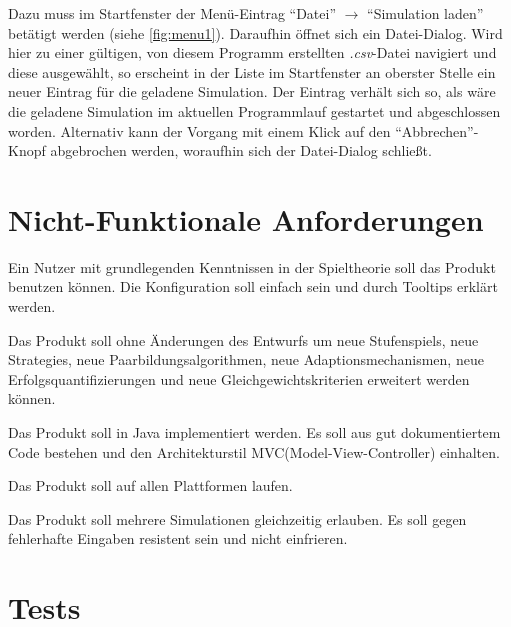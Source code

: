 \documentclass[parskip=full,11pt]{scrartcl}
\begin{document}
Dazu muss im Startfenster der Menü-Eintrag \enquote{Datei} \(\rightarrow\) \enquote{Simulation laden} betätigt werden (siehe \cref{fig:menu1}). Daraufhin öffnet sich ein Datei-Dialog. Wird hier zu einer gültigen, von diesem Programm erstellten \textit{.csv}-Datei navigiert und diese ausgewählt, so erscheint in der Liste im Startfenster an oberster Stelle ein neuer Eintrag für die geladene Simulation. Der Eintrag verhält sich so, als wäre die geladene Simulation im aktuellen Programmlauf gestartet und abgeschlossen worden. Alternativ kann der Vorgang mit einem Klick auf den \enquote{Abbrechen}-Knopf abgebrochen werden, woraufhin sich der Datei-Dialog schließt.

\section{Nicht-Funktionale Anforderungen}


Ein \Gls{Nutzer} mit grundlegenden Kenntnissen in der Spieltheorie soll das Produkt benutzen können. Die \Gls{Konfiguration} soll einfach sein und durch Tooltips erklärt werden.


Das Produkt soll ohne Änderungen des Entwurfs um neue \Glspl{Stufenspiel}, neue \Glspl{Strategie}, neue Paarbildungsalgorithmen, neue Adaptionsmechanismen, neue Erfolgsquantifizierungen und neue Gleichgewichtskriterien erweitert werden können.


Das Produkt soll in Java implementiert werden. Es soll aus gut dokumentiertem Code bestehen und den Architekturstil MVC(Model-View-Controller) einhalten.


Das Produkt soll auf allen Plattformen laufen.


Das Produkt soll mehrere Simulationen gleichzeitig erlauben. Es soll gegen fehlerhafte Eingaben resistent sein und nicht einfrieren.

\section{Tests}
\end{document}
